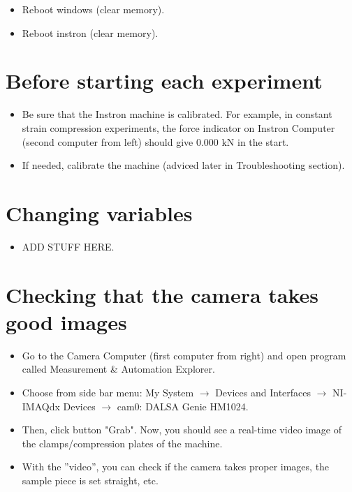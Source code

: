 \documentclass[a4paper]{article}
\begin{document}
\begin{itemize}
  \item Reboot windows (clear memory).
  \item Reboot instron (clear memory).
\end{itemize}

\section{Before starting each experiment}

\begin{itemize}
  \item Be sure that the Instron machine is calibrated. For example, in constant strain compression experiments, the force indicator on Instron Computer (second computer from left) should give 0.000 kN in the start.
  \item If needed, calibrate the machine (adviced later in Troubleshooting section).
\end{itemize}

\section{Changing variables}

\begin{itemize}
  \item ADD STUFF HERE.
\end{itemize}

\section{Checking that the camera takes good images}

\begin{itemize}
  \item Go to the Camera Computer (first computer from right) and open program called Measurement \& Automation Explorer.
  \item Choose from side bar menu: My System $\rightarrow$ Devices and Interfaces $\rightarrow$ NI-IMAQdx Devices $\rightarrow$ cam0: DALSA Genie HM1024.
  \item Then, click button "Grab". Now, you should see a real-time video image of the clamps/compression plates of the machine.
  \item With the ''video'', you can check if the camera takes proper images, the sample piece is set straight, etc.
\end{itemize}
\end{document}
